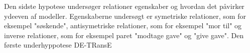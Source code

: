 Den sidste hypotese undersøger relationer egenskaber og hvordan det påvirker ydeeven af modeller. Egenskaberne undersøgt er symetriske relationer, som for eksempel "søskende", antisymetriske relationer, som for eksempel "mor til" og inverse relationer, som for eksempel paret "modtage gave" og "give gave". 
Den første underhyppotese DE-TRansE 



